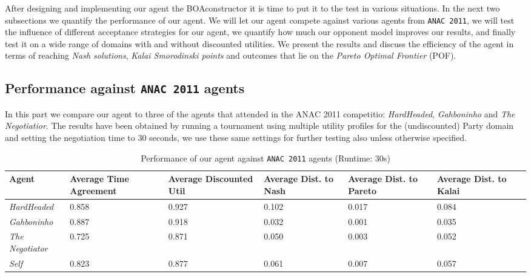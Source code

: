 After designing and implementing our agent the BOAconstructor it is time to put it to the test in various situations. In the next two subsections we quantify the performance of our agent. 
We will let our agent compete against various agents from \texttt{ANAC 2011}, we will test the influence of different acceptance strategies for our agent,
we quantify how much our opponent model improves our results, and finally test it on a wide range of domains with and without discounted utilities.
We present the results and discuss the efficiency of the agent in terms of reaching \emph{Nash solutions}, \emph{Kalai Smorodinski points} and outcomes that lie on the \emph{Pareto Optimal Frontier} (POF).

\subsection{Performance against \texttt{ANAC 2011} agents}

In this part we compare our agent to three of the agents that attended in the ANAC 2011 competitio: \emph{HardHeaded}, \emph{Gahboninho} and \emph{The Negotiatior}. The results have been obtained by running a tournament using multiple utility profiles for the (undiscounted) Party domain and setting the negotiation time to $30$ seconds,
we use these same settings for further testing also unless otherwise specified. 

\begin{table}[H]
	\centering
	\small
    \begin{tabular}{m{2cm}m{2cm}m{2cm}m{2cm}m{2cm}m{2cm}m{2cm}}
    \toprule
    Agent                       & Average Time Agreement & Average Discounted Util & Average Dist. to Nash & Average Dist. to Pareto & Average Dist. to Kalai \\
    \midrule
    \emph{HardHeaded}		& 0.858  & 0.927  & 0.102  & 0.017  & 0.084   \\ 
    \emph{Gahboninho}   	& 0.887  & 0.918  & 0.032  & 0.001  & 0.035   \\ 
    \emph{The Negotiator} 	& 0.725  & 0.871  & 0.050  & 0.003  & 0.052   \\ 
    \emph{Self}                 & 0.823  & 0.877  & 0.061  & 0.007  & 0.057   \\
    \bottomrule
    \end{tabular}
    \caption{Performance of our agent against \texttt{ANAC 2011} agents (Runtime: $30$s) \label{table:anac2011-results}}
\end{table}

